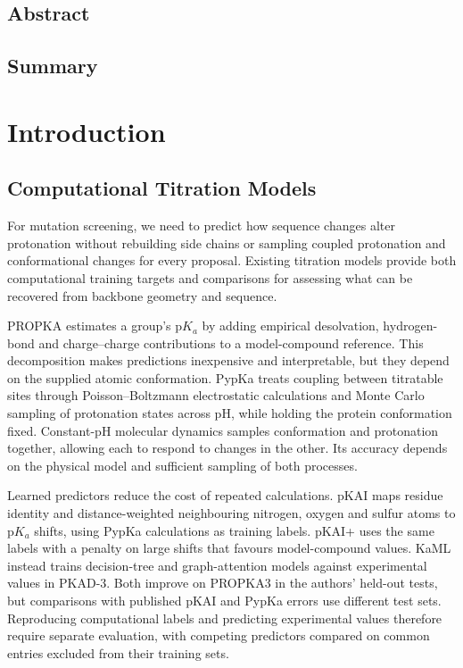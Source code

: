 \subsection{Abstract}
\label{sec:jaxka-abstract}

\subsection{Summary}
\label{sec:jaxka-summary}

\section{Introduction}
\label{sec:jaxka-intro}

\subsection{Computational Titration Models}
\label{sec:jaxka-titration-models}

For mutation screening, we need to predict how sequence changes alter protonation without rebuilding side chains or sampling coupled protonation and conformational changes for every proposal. Existing titration models provide both computational training targets and comparisons for assessing what can be recovered from backbone geometry and sequence.

PROPKA estimates a group's $\mathrm{p}K_a$ by adding empirical desolvation, hydrogen-bond and charge--charge contributions to a model-compound reference. This decomposition makes predictions inexpensive and interpretable, but they depend on the supplied atomic conformation.\supercite{liVeryFastEmpirical2005,olssonPROPKA3ConsistentTreatment2011} PypKa treats coupling between titratable sites through Poisson--Boltzmann electrostatic calculations and Monte Carlo sampling of protonation states across pH, while holding the protein conformation fixed.\supercite{reisPypKaFlexiblePython2020} Constant-pH molecular dynamics samples conformation and protonation together, allowing each to respond to changes in the other. Its accuracy depends on the physical model and sufficient sampling of both processes.\supercite{deoliveiraConstantPHMolecular2022}

Learned predictors reduce the cost of repeated calculations. pKAI maps residue identity and distance-weighted neighbouring nitrogen, oxygen and sulfur atoms to $\mathrm{p}K_a$ shifts, using PypKa calculations as training labels. pKAI+ uses the same labels with a penalty on large shifts that favours model-compound values.\supercite{reisFastInterpretableDeep2022} KaML instead trains decision-tree and graph-attention models against experimental values in PKAD-3. Both improve on PROPKA3 in the authors' held-out tests, but comparisons with published pKAI and PypKa errors use different test sets.\supercite{shenKaMLsPredictingProtein2025} Reproducing computational labels and predicting experimental values therefore require separate evaluation, with competing predictors compared on common entries excluded from their training sets.

